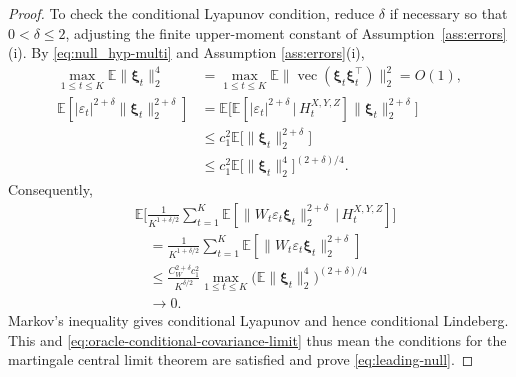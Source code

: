\documentclass[12pt]{article}
\def\E{\mathbb{E}}
\newcommand{\Rajen}[1]{{ \color{red} Rajen: #1}}
\newcommand\given{\,|\,}
\numberwithin{equation}{section}
\begin{document}
\begin{proof}
To check the conditional Lyapunov condition, reduce \(\delta\) if necessary so that
\(0<\delta\leq2\), adjusting the finite upper-moment constant of Assumption~\ref{ass:errors}(i). By
\eqref{eq:null_hyp-multi} and 
Assumption
\ref{ass:errors}(i),
\begin{align*}
\max_{1\leq t\leq K}\E\|\boldsymbol\xi_t\|_2^4
&=\max_{1\leq t\leq K}\E\|\operatorname{vec}(\boldsymbol\xi_t\boldsymbol\xi_t^\top)\|_2^2
=O(1),\\
\E[|\varepsilon_t|^{2+\delta}\|\boldsymbol\xi_t\|_2^{2+\delta}]
&=\E\big[
\E[|\varepsilon_t|^{2+\delta}\given H_t^{X,Y,Z}]
\|\boldsymbol\xi_t\|_2^{2+\delta}
\big]\\
&\leq c_1^2\E \big[\|\boldsymbol\xi_t\|_2^{2+\delta}\big]\\
& \leq c_1^2\E\big[\|\boldsymbol\xi_t\|_2^4\big]^{(2+\delta)/4}.
\end{align*}
Consequently,
\begin{align*}
&\E\Big[
\frac1{K^{1+\delta/2}}\sum_{t=1}^K
\E[\|W_t\varepsilon_t\boldsymbol\xi_t\|_2^{2+\delta}
\given H_t^{X,Y,Z}]
\Big]\\
&\quad=\frac1{K^{1+\delta/2}}\sum_{t=1}^K
\E[\|W_t\varepsilon_t\boldsymbol\xi_t\|_2^{2+\delta}]\\
&\quad\leq\frac{C_W^{2+\delta}c_1^2}{K^{\delta/2}}
\max_{1\leq t\leq K}\big(\E\|\boldsymbol\xi_t\|_2^4\big)^{(2+\delta)/4}\\
& \quad\rightarrow0.
\end{align*}
Markov's inequality gives conditional Lyapunov and hence conditional
Lindeberg. This and \eqref{eq:oracle-conditional-covariance-limit} thus mean the conditions for the martingale central limit theorem \citep{dvoretzky1972asymptotic} are satisfied and prove \eqref{eq:leading-null}.

\end{proof}
\end{document}
